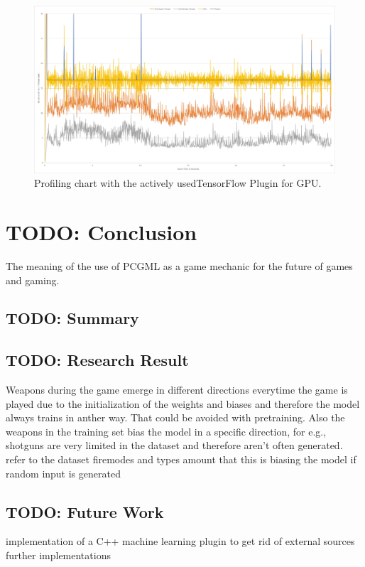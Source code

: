 \documentclass[MGS,Master,english]{twbook}%
\begin{document}
\begin{figure}[!htbp]
	\centering
	\includegraphics[width=1.0\linewidth]{PICs/Profiling/tf_gpu}
	\caption{Profiling chart with the actively usedTensorFlow Plugin for GPU.}
\end{figure}




%
%
\clearpage
\chapter{TODO: Conclusion}
The meaning of the use of PCGML as a game mechanic for the future of games and gaming. 
\section{TODO: Summary}
\section{TODO: Research Result}
Weapons during the game emerge in different directions everytime the game is played due to the initialization of the weights and biases and therefore the model always trains in anther way. That could be avoided with pretraining. Also the weapons in the training set bias the model in a specific direction, for e.g., shotguns are very limited in the dataset and therefore aren't often generated. refer to the dataset firemodes and types amount that this is biasing the model if random input is generated
\section{TODO: Future Work}
implementation of a C++ machine learning plugin to get rid of external sources
further implementations
\end{document}
